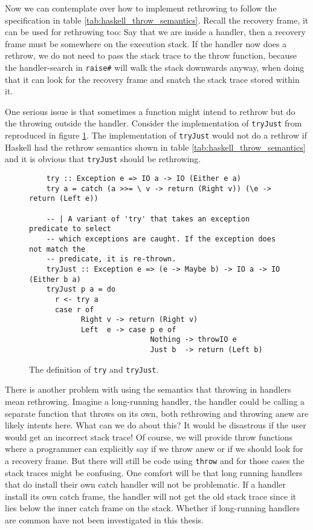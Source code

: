 Now we can contemplate over how to implement rethrowing to follow the
specification in table \ref{tab:haskell_throw_semantics}. Recall the
recovery frame, it can be used for rethrowing too: Say that we are
inside a handler, then a recovery frame must be somewhere on the
execution stack. If the handler now does a rethrow, we do not need to pass
the stack trace to the throw function, because the handler-search in
\texttt{raise\#} will walk the stack downwards anyway, when doing that
it can look for the recovery frame and snatch the stack trace stored
within it.

One serious issue is that sometimes a function might intend to rethrow
but do the throwing outside the handler. Consider the implementation of
\texttt{tryJust} from \cite{hackage_base_control_exception_base_tryJust}
reproduced in figure \ref{fig:try_just}. The implementation of \texttt{tryJust} would
not do a rethrow if Haskell had the rethrow semantics shown in
table \ref{tab:haskell_throw_semantics} and it is obvious that
\texttt{tryJust} should be rethrowing.

\begin{figure}
\begin{mdframed}
  \begin{verbatim}
    try :: Exception e => IO a -> IO (Either e a)
    try a = catch (a >>= \ v -> return (Right v)) (\e -> return (Left e))

    -- | A variant of 'try' that takes an exception predicate to select
    -- which exceptions are caught. If the exception does not match the
    -- predicate, it is re-thrown.
    tryJust :: Exception e => (e -> Maybe b) -> IO a -> IO (Either b a)
    tryJust p a = do
      r <- try a
      case r of
            Right v -> return (Right v)
            Left  e -> case p e of
                            Nothing -> throwIO e
                            Just b  -> return (Left b)
  \end{verbatim}
  \caption{The definition of \texttt{try} and \texttt{tryJust}.}
  \label{fig:try_just}
\end{mdframed}
\end{figure}

There is another problem with using the semantics that throwing in
handlers mean rethrowing. Imagine a long-running handler, the handler
could be calling a separate function that throws on its own, both
rethrowing and throwing anew are likely intents here. What can we
do about this? It would be disastrous if the
user would get an incorrect stack trace! Of course, we will provide
throw functions where a programmer can explicitly say if we throw anew
or if we should look for a recovery frame. But there will still be code
using \texttt{throw} and for those cases the stack traces might be
confusing. One comfort will be that long running handlers that do
install their own catch handler will not be problematic. If a handler install its
own catch frame, the handler will not get the old stack trace
since it lies below the inner catch frame on the stack.
Whether if long-running handlers are common have not been investigated
in this thesis.

